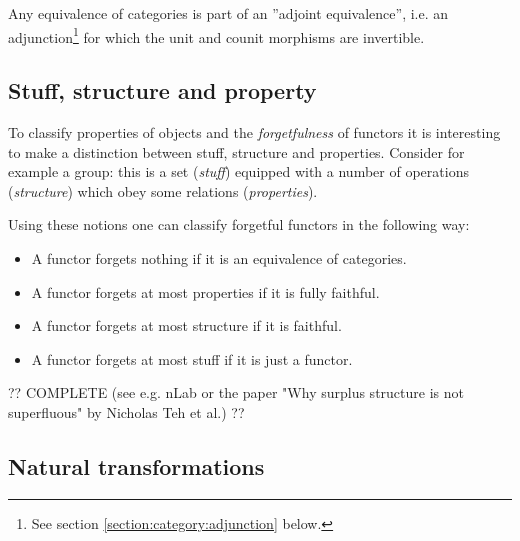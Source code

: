 
    \begin{property}
        Any equivalence of categories is part of an ''adjoint equivalence'', i.e. an adjunction\footnote{See section \ref{section:category:adjunction} below.} for which the unit and counit morphisms are invertible.
    \end{property}

\subsection{Stuff, structure and property}

    To classify properties of objects and the \textit{forgetfulness} of functors it is interesting to make a distinction between stuff, structure and properties. Consider for example a group: this is a set (\textit{stuff}) equipped with a number of operations (\textit{structure}) which obey some relations (\textit{properties}).

    Using these notions one can classify forgetful functors in the following way:
    \begin{itemize}
        \item A functor forgets nothing if it is an equivalence of categories.
        \item A functor forgets at most properties if it is fully faithful.
        \item A functor forgets at most structure if it is faithful.
        \item A functor forgets at most stuff if it is just a functor.
    \end{itemize}

    ?? COMPLETE (see e.g. nLab or the paper "Why surplus structure is not superfluous" by Nicholas Teh et al.) ??

\subsection{Natural transformations}

